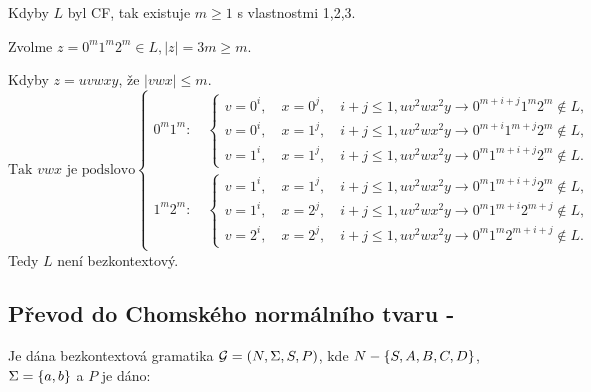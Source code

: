 Kdyby $L$ byl CF, tak existuje $m \geq 1$ s vlastnostmi 1,2,3.

Zvolme $z = 0^m 1^m 2^m \in L, |z| = 3m \geq m$.

Kdyby $z = uvwxy$, že $|vwx| \leq m$. 
\[
\text{Tak $vwx$ je podslovo}
\begin{cases}
    0^m 1^m:\quad 
      \begin{cases}
        v = 0^i,\quad x = 0^j,\quad i+j \leq 1, uv^2wx^2y \rightarrow 0^{m+i+j}1^m2^m \not\in L, \\[1ex]
        v = 0^i,\quad x = 1^j,\quad i+j \leq 1, uv^2wx^2y \rightarrow 0^{m+i}1^{m+j}2^m \not\in L, \\[1ex]
        v = 1^i,\quad x = 1^j,\quad i+j \leq 1, uv^2wx^2y \rightarrow 0^{m}1^{m+i+j}2^m \not\in L.
      \end{cases}
    \\[2ex]
    1^m 2^m:\quad 
      \begin{cases}
        v = 1^i,\quad x = 1^j,\quad i+j \leq 1, uv^2wx^2y \rightarrow 0^{m}1^{m+i+j}2^m \not\in L, \\[1ex]
        v = 1^i,\quad x = 2^j,\quad i+j \leq 1, uv^2wx^2y \rightarrow 0^{m}1^{m+i}2^{m+j} \not\in L, \\[1ex]
        v = 2^i,\quad x = 2^j,\quad i+j \leq 1, uv^2wx^2y \rightarrow 0^{m}1^{m}2^{m+i+j} \not\in L.
      \end{cases}
\end{cases}
\]
Tedy $L$ není bezkontextový.

\newpage
\subsection{Převod do Chomského normálního tvaru - }

Je dána bezkontextová gramatika $\mathcal{G} = (N, \Sigma, S, P)$, kde $N - \left\lbrace S, A, B, C, D \right\rbrace$, $\Sigma = \left\lbrace a, b \right\rbrace$ a $P$ je 
dáno:

